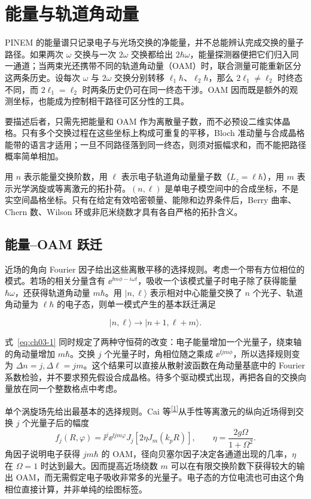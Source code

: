 \chapter{能量与轨道角动量}

PINEM 的能量谱只记录电子与光场交换的净能量，并不总能辨认完成交换的量子路径。如果两次 $\omega$ 交换与一次 $2\omega$ 交换都给出 $2\hbar\omega$，能量探测器便把它们归入同一通道；当两束光还携带不同的轨道角动量（OAM）时，联合测量可能重新区分这两条历史。设每次 $\omega$ 与 $2\omega$ 交换分别转移 $\ell_1\hbar$、$\ell_2\hbar$，那么 $2\ell_1\ne\ell_2$ 时终态不同，而 $2\ell_1=\ell_2$ 时两条历史仍可在同一终态干涉。OAM 因而既是额外的观测坐标，也能成为控制相干路径可区分性的工具。

要描述后者，只需先把能量和 OAM 作为离散量子数，而不必预设二维实体晶格。只有多个交换过程在这些坐标上构成可重复的平移，Bloch 准动量与合成晶格能带的语言才适用；一旦不同路径落到同一终态，则须对振幅求和，而不能把路径概率简单相加。


用 $n$ 表示能量交换阶数，用 $\ell$ 表示电子轨道角动量量子数（$L_z=\ell\hbar$），用 $m$ 表示光学涡旋或等离激元的拓扑荷。$(n,\ell)$ 是单电子模空间中的合成坐标，不是实空间晶格坐标。只有在给定有效哈密顿量、能隙和边界条件后，Berry 曲率、Chern 数、Wilson 环或非厄米绕数才具有各自严格的拓扑含义。


\section{能量–OAM 跃迁}
近场的角向 Fourier 因子给出这些离散平移的选择规则。考虑一个带有方位相位的模式。若场的相关分量含有 $\ee^{\ii m\phi-i\omega t}$，吸收一个该模式量子时电子除了获得能量 $\hbar\omega$，还获得轨道角动量 $m\hbar$。用 $|n,\ell\rangle$ 表示相对中心能量交换了 $n$ 个光子、轨道角动量为 $\ell\hbar$ 的电子态，则单一模式产生的基本跃迁满足

\begin{equation}
|n,\ell\rangle\longrightarrow |n+1,\ell+m\rangle .
\label{eq:ch03-1}
\end{equation}

式~\cref{eq:ch03-1} 同时规定了两种守恒荷的改变：电子能量增加一个光量子，绕束轴的角动量增加 $m\hbar$。交换 $j$ 个光量子时，角相位随之乘成 $\ee^{\ii jm\phi}$，所以选择规则变为 $\Delta n=j,\Delta\ell=jm$。这个结果可以直接从散射波函数在角动量基底中的 Fourier 系数检验，并不要求预先假设合成晶格。待多个驱动模式出现，再把各自的交换向量放在同一个整数格点中考虑。


单个涡旋场先给出最基本的选择规则。Cai 等\textsuperscript{\hyperref[ch03-ref1]{[1]}}从手性等离激元的纵向近场得到交换 $j$ 个光量子后的幅度
\[
f_j(R,\varphi)=\ii^j\ee^{\ii jm\varphi}J_j\!\left[2\eta J_m(k_pR)\right],
\qquad \eta=\frac{2g\Omega}{1+\Omega^2}.
\]
角因子说明电子获得 $jm\hbar$ 的 OAM，径向贝塞尔因子决定各通道出现的几率，$\eta$ 在 $\Omega=1$ 时达到最大。因而提高近场绕数 $m$ 可以在有限交换阶数下获得较大的输出 OAM，而无需假定电子吸收非常多的光量子。电子态的方位电流也可由这个角相位直接计算，并非单纯的绘图标签。

